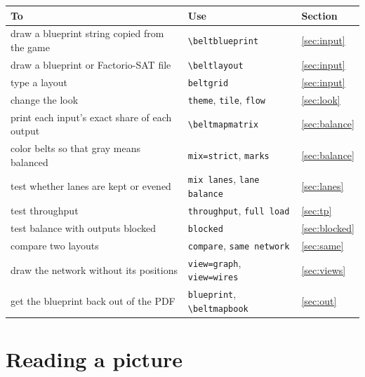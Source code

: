 \documentclass[11pt]{article}
\newcommand\cs[1]{\texttt{\textbackslash#1}}
\newcommand\key[1]{\texttt{#1}}
\begin{document}
	\bigskip
	\begin{tabularx}{\linewidth}{@{}X l l@{}}
		\toprule
		To & Use & Section \\
		\midrule
		draw a blueprint string copied from the game & \cs{beltblueprint} & \ref{sec:input} \\
		draw a blueprint or Factorio-SAT file & \cs{beltlayout} & \ref{sec:input} \\
		type a layout & \texttt{beltgrid} & \ref{sec:input} \\
		change the look & \key{theme}, \key{tile}, \key{flow} & \ref{sec:look} \\
		print each input's exact share of each output & \cs{beltmapmatrix} & \ref{sec:balance} \\
		color belts so that gray means balanced & \key{mix=strict}, \key{marks} & \ref{sec:balance} \\
		test whether lanes are kept or evened & \key{mix lanes}, \key{lane balance} & \ref{sec:lanes} \\
		test throughput & \key{throughput}, \key{full load} & \ref{sec:tp} \\
		test balance with outputs blocked & \key{blocked} & \ref{sec:blocked} \\
		compare two layouts & \key{compare}, \key{same network} & \ref{sec:same} \\
		draw the network without its positions & \key{view=graph}, \key{view=wires} & \ref{sec:views} \\
		get the blueprint back out of the PDF & \key{blueprint}, \cs{beltmapbook} & \ref{sec:out} \\
		\bottomrule
	\end{tabularx}

	\section{Reading a picture}
\end{document}
